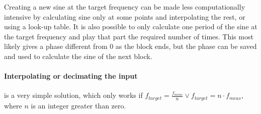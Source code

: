Creating a new sine at the target frequency can be made less computationally intensive by calculating sine only at some points and interpolating the rest, or using a look-up table. It is also possible to only calculate one period of the sine at the target frequency and play that part the required number of times. This most likely gives a phase different from 0 as the block ends, but the phase can be saved and used to calculate the sine of the next block.

\paragraph{Interpolating or decimating the input} is a very simple solution, which only works if $f_{target}=\frac{f_{meas}}{n}\vee f_{target} =n\cdot f_{meas}$, where $n$ is an integer greater than zero.